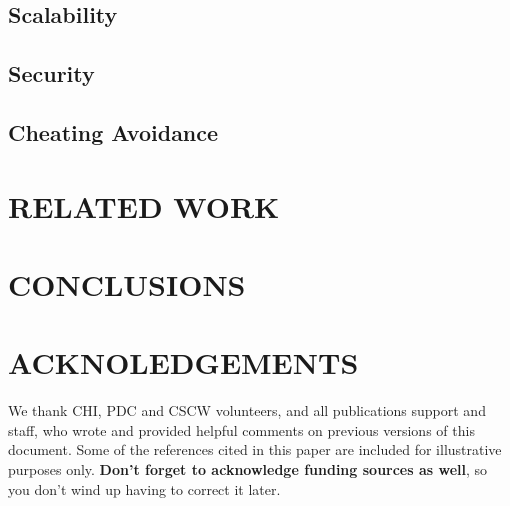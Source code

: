 \documentclass{sigchi}
\begin{document}
\subsection{Scalability}

\subsection{Security}

\subsection{Cheating Avoidance}

\section{RELATED WORK}
\label{relatedwork}

\section{CONCLUSIONS}
\label{conclusions}

\section{ACKNOLEDGEMENTS}

We thank CHI, PDC and CSCW volunteers, and all publications support
and staff, who wrote and provided helpful comments on previous
versions of this document.  Some of the references cited in this paper
are included for illustrative purposes only.  \textbf{Don't forget
to acknowledge funding sources as well}, so you don't wind up
having to correct it later.


\balance


\end{document}
